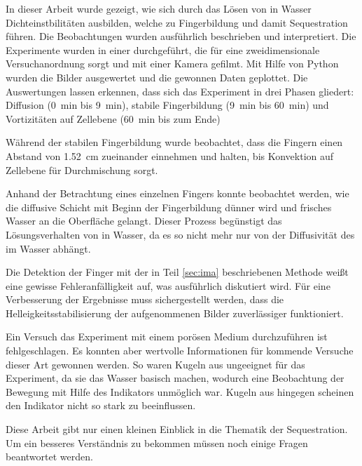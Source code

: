 
\label{cha:con}

In dieser Arbeit wurde gezeigt, wie sich durch das Lösen von \COT in Wasser Dichteinstbilitäten ausbilden, welche zu Fingerbildung und damit \COTm Sequestration führen. Die Beobachtungen wurden ausführlich beschrieben und interpretiert.
Die Experimente wurden in einer \HSC durchgeführt, die für eine zweidimensionale Versuchanordnung sorgt und mit einer Kamera gefilmt.
Mit Hilfe von Python wurden die Bilder ausgewertet und die gewonnen Daten geplottet.
Die Auswertungen lassen erkennen, dass sich das Experiment in drei Phasen gliedert: 
 Diffusion (\SI{0}{\minute} bis \SI{9}{\minute}),
 stabile Fingerbildung (\SI{9}{\minute} bis \SI{60}{\minute}) und
 Vortizitäten auf Zellebene (\SI{60}{\minute} bis zum Ende) 

Während der stabilen Fingerbildung wurde beobachtet, dass die Fingern einen Abstand von \SI[round-precision=2]{1.52}{\centi\meter} zueinander einnehmen und halten, bis Konvektion auf Zellebene für Durchmischung sorgt.

Anhand der Betrachtung eines einzelnen Fingers konnte beobachtet werden, wie die diffusive Schicht mit Beginn der Fingerbildung dünner wird und frisches Wasser an die Oberfläche gelangt. Dieser Prozess begünstigt das Lösungsverhalten von \COT in Wasser, da es so nicht mehr nur von der Diffusivität des \COT im Wasser abhängt. 

Die Detektion der Finger mit der in Teil \ref{sec:ima} beschriebenen Methode weißt eine gewisse Fehleranfälligkeit auf, was ausführlich diskutiert wird. Für eine Verbesserung der Ergebnisse muss sichergestellt werden, dass die Helleigkeitsstabilisierung der aufgenommenen Bilder zuverlässiger funktioniert. 


Ein Versuch das Experiment mit einem porösen Medium durchzuführen ist fehlgeschlagen. Es konnten aber wertvolle Informationen für kommende Versuche dieser Art gewonnen werden. So waren Kugeln aus \KNG ungeeignet für das Experiment, da sie das Wasser basisch machen, wodurch eine Beobachtung der \COTm Bewegung mit Hilfe des \BCGm Indikators unmöglich war. Kugeln aus \BOG hingegen scheinen den Indikator nicht so stark zu beeinflussen.


Diese Arbeit gibt nur einen kleinen Einblick in die Thematik der \COTm Sequestration. Um ein besseres Verständnis zu bekommen müssen noch einige Fragen beantwortet werden. 

